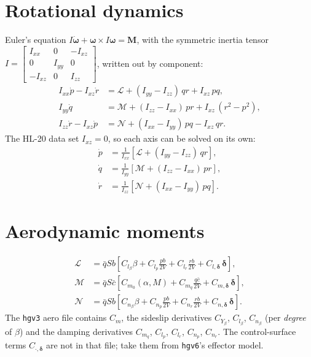 \documentclass[11pt]{report}
\numberwithin{equation}{chapter}
\newcommand{\vb}[1]{\bm{#1}}
\newcommand{\code}[1]{\texttt{#1}}
\begin{document}
\section{Rotational dynamics}

Euler's equation $I\dot{\vb\omega} + \vb\omega\times I\vb\omega = \vb M$, with the symmetric
inertia tensor
$I = \begin{bmatrix} I_{xx} & 0 & -I_{xz}\\ 0 & I_{yy} & 0\\ -I_{xz} & 0 & I_{zz}\end{bmatrix}$,
written out by component:
\begin{align}
  I_{xx}\dot p - I_{xz}\dot r &= \mathcal L + (I_{yy}-I_{zz})\,q r + I_{xz}\,p q, \\
  I_{yy}\dot q &= \mathcal M + (I_{zz}-I_{xx})\,p r + I_{xz}\,(r^2 - p^2), \\
  I_{zz}\dot r - I_{xz}\dot p &= \mathcal N + (I_{xx}-I_{yy})\,p q - I_{xz}\,q r .
\end{align}
The HL-20 data set $I_{xz}=0$, so each axis can be solved on its own:
\begin{align}
  \dot p &= \frac{1}{I_{xx}}\left[\mathcal L + (I_{yy}-I_{zz})\,q r\right], \label{eq:pdot}\\
  \dot q &= \frac{1}{I_{yy}}\left[\mathcal M + (I_{zz}-I_{xx})\,p r\right], \label{eq:qdot}\\
  \dot r &= \frac{1}{I_{zz}}\left[\mathcal N + (I_{xx}-I_{yy})\,p q\right]. \label{eq:rdot_body}
\end{align}

\section{Aerodynamic moments}

\begin{align}
  \mathcal L &= \bar q S b\left[C_{l_\beta}\beta + C_{l_p}\frac{p b}{2V} + C_{l_r}\frac{r b}{2V} + C_{l,\vb\delta}\,\vb\delta\right],\\
  \mathcal M &= \bar q S \bar c\left[C_{m_0}(\alpha,M) + C_{m_q}\frac{q\bar c}{2V} + C_{m,\vb\delta}\,\vb\delta\right],\\
  \mathcal N &= \bar q S b\left[C_{n_\beta}\beta + C_{n_p}\frac{p b}{2V} + C_{n_r}\frac{r b}{2V} + C_{n,\vb\delta}\,\vb\delta\right].
\end{align}
The \code{hgv3} aero file contains $C_m$, the sideslip derivatives $C_{Y_\beta}$, $C_{l_\beta}$,
$C_{n_\beta}$ (per \emph{degree} of $\beta$) and the damping derivatives $C_{m_q}$, $C_{l_p}$,
$C_{l_r}$, $C_{n_p}$, $C_{n_r}$. The control-surface terms $C_{\cdot,\vb\delta}$ are not in that file;
take them from \code{hgv6}'s effector model.
\end{document}
